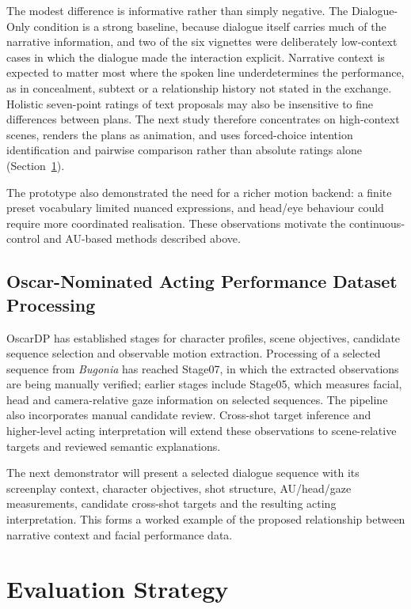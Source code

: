 \documentclass[11pt,a4paper]{article}
\begin{document}
The modest difference is informative rather than simply negative. The Dialogue-Only condition is a strong baseline, because dialogue itself carries much of the narrative information, and two of the six vignettes were deliberately low-context cases in which the dialogue made the interaction explicit. Narrative context is expected to matter most where the spoken line underdetermines the performance, as in concealment, subtext or a relationship history not stated in the exchange. Holistic seven-point ratings of text proposals may also be insensitive to fine differences between plans. The next study therefore concentrates on high-context scenes, renders the plans as animation, and uses forced-choice intention identification and pairwise comparison rather than absolute ratings alone (Section~\ref{sec:evaluation}).

The prototype also demonstrated the need for a richer motion backend: a finite preset vocabulary limited nuanced expressions, and head/eye behaviour could require more coordinated realisation. These observations motivate the continuous-control and AU-based methods described above.

\subsection{Oscar-Nominated Acting Performance Dataset Processing}

OscarDP has established stages for character profiles, scene objectives, candidate sequence selection and observable motion extraction. Processing of a selected sequence from \emph{Bugonia} has reached Stage07, in which the extracted observations are being manually verified; earlier stages include Stage05, which measures facial, head and camera-relative gaze information on selected sequences. The pipeline also incorporates manual candidate review. Cross-shot target inference and higher-level acting interpretation will extend these observations to scene-relative targets and reviewed semantic explanations.

The next demonstrator will present a selected dialogue sequence with its screenplay context, character objectives, shot structure, AU/head/gaze measurements, candidate cross-shot targets and the resulting acting interpretation. This forms a worked example of the proposed relationship between narrative context and facial performance data.

\section{Evaluation Strategy}
\label{sec:evaluation}
\end{document}
